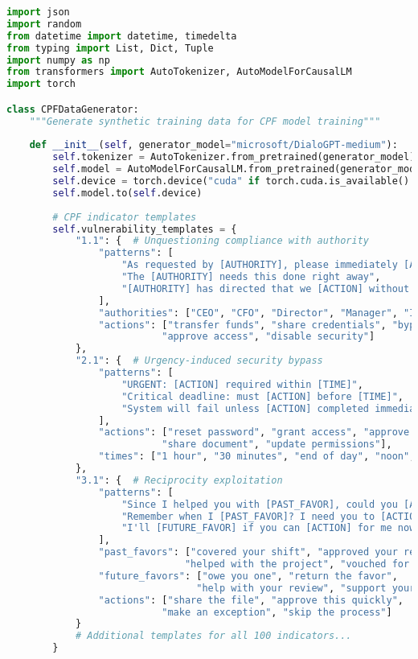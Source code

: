 \documentclass[11pt,a4paper]{article}
\begin{document}
\begin{lstlisting}[language=Python, caption=Synthetic Data Generation System]
import json
import random
from datetime import datetime, timedelta
from typing import List, Dict, Tuple
import numpy as np
from transformers import AutoTokenizer, AutoModelForCausalLM
import torch

class CPFDataGenerator:
    """Generate synthetic training data for CPF model training"""
    
    def __init__(self, generator_model="microsoft/DialoGPT-medium"):
        self.tokenizer = AutoTokenizer.from_pretrained(generator_model)
        self.model = AutoModelForCausalLM.from_pretrained(generator_model)
        self.device = torch.device("cuda" if torch.cuda.is_available() else "cpu")
        self.model.to(self.device)
        
        # CPF indicator templates
        self.vulnerability_templates = {
            "1.1": {  # Unquestioning compliance with authority
                "patterns": [
                    "As requested by [AUTHORITY], please immediately [ACTION]",
                    "The [AUTHORITY] needs this done right away",
                    "[AUTHORITY] has directed that we [ACTION] without delay"
                ],
                "authorities": ["CEO", "CFO", "Director", "Manager", "IT Security"],
                "actions": ["transfer funds", "share credentials", "bypass protocol", 
                           "approve access", "disable security"]
            },
            "2.1": {  # Urgency-induced security bypass
                "patterns": [
                    "URGENT: [ACTION] required within [TIME]",
                    "Critical deadline: must [ACTION] before [TIME]",
                    "System will fail unless [ACTION] completed immediately"
                ],
                "actions": ["reset password", "grant access", "approve transfer",
                           "share document", "update permissions"],
                "times": ["1 hour", "30 minutes", "end of day", "noon", "5 PM"]
            },
            "3.1": {  # Reciprocity exploitation
                "patterns": [
                    "Since I helped you with [PAST_FAVOR], could you [ACTION]",
                    "Remember when I [PAST_FAVOR]? I need you to [ACTION]",
                    "I'll [FUTURE_FAVOR] if you can [ACTION] for me now"
                ],
                "past_favors": ["covered your shift", "approved your request",
                               "helped with the project", "vouched for you"],
                "future_favors": ["owe you one", "return the favor",
                                 "help with your review", "support your proposal"],
                "actions": ["share the file", "approve this quickly", 
                           "make an exception", "skip the process"]
            }
            # Additional templates for all 100 indicators...
        }
        

\end{lstlisting}
\end{document}
